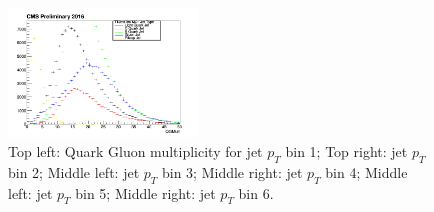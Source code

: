 \begin{figure}[htbp]
\begin{center}
  \includegraphics[width=0.45\textwidth]{sections/mc4/TopTagger/figures/_b_qgmultjetptbin5_.png}
 \end{center}
 \caption{Top left: Quark Gluon multiplicity for jet $p_{T}$ bin 1; Top right: jet $p_{T}$ bin 2; Middle left: jet $p_{T}$ bin 3; Middle right: jet $p_{T}$ bin 4; Middle left: jet $p_{T}$ bin 5; Middle right: jet $p_{T}$ bin 6.}
 \label{fig:c4ttqgmultjetpt}
\end{figure}

